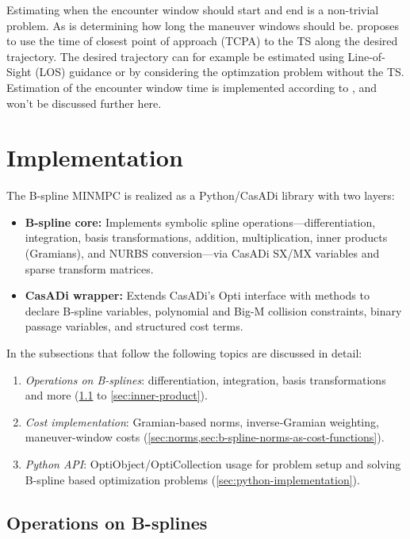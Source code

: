 Estimating when the encounter window should start and end is a non-trivial problem. As is determining how long the maneuver windows should be. \cite{Thyri2022-MPC} proposes to use the time of closest point of approach (TCPA) to the TS along the desired trajectory. The desired trajectory can for example be estimated using Line-of-Sight (LOS) guidance \citep{Fossen2011-Handbook} or by considering the optimzation problem without the TS. Estimation of the encounter window time is implemented according to \cite{Thyri2022-MPC}, and won't be discussed further here.


\section{Implementation}\label{sec:implementation}


The B-spline MINMPC is realized as a Python/CasADi library with two layers:

\begin{itemize}
  \item \textbf{B-spline core:}  
    Implements symbolic spline operations—differentiation, integration, basis transformations, addition, multiplication, inner products (Gramians), and NURBS conversion—via CasADi SX/MX variables and sparse transform matrices.
  \item \textbf{CasADi wrapper:}  
    Extends CasADi’s Opti interface with methods to declare B-spline variables, polynomial and Big-M collision constraints, binary passage variables, and structured cost terms.
\end{itemize}

In the subsections that follow the following topics are discussed in detail:
\begin{enumerate}
  \item \emph{Operations on B-splines}: differentiation, integration, basis transformations and more (\cref{sec:operations-on-b-splines} to \cref{sec:inner-product}).
  \item \emph{Cost implementation}: Gramian‐based norms, inverse‐Gramian weighting, maneuver-window costs (\cref{sec:norms,sec:b-spline-norms-as-cost-functions}).
  \item \emph{Python API}: OptiObject/OptiCollection usage for problem setup and solving B-spline based optimization problems (\cref{sec:python-implementation}).
\end{enumerate}

\subsection{Operations on B-splines}\label{sec:operations-on-b-splines}

